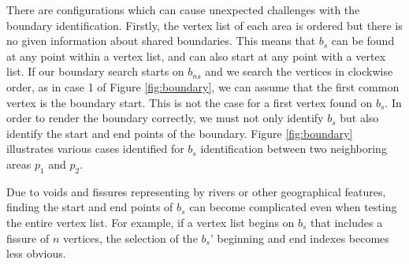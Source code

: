 There are configurations which can cause unexpected challenges with the boundary identification. Firstly, the vertex list of each area is ordered but there is no given information about shared boundaries. This means that $b_{s}$ can be found at any point within a vertex list, and can also start at any point with a vertex list. If our boundary search starts on $b_{ns}$ and we search the vertices in clockwise order, as in case 1 of Figure \ref{fig:boundary}, we can assume that the first common vertex is the boundary start. This is not the case for a first vertex found on $b_{s}$. In order to render the boundary correctly, we must not only identify $b_{s}$ but also identify the start and end points of the boundary. Figure \ref{fig:boundary} illustrates various cases identified for $b_{s}$ identification between two neighboring areas $p_1$ and $p_2$. 

Due to voids and fissures representing by rivers or other geographical features, finding the start and end points of $b_{s}$ can become complicated even when testing the entire vertex list. For example, if a vertex list begins on $b_{s}$ that includes a fissure of $n$ vertices, the selection of the $b_{s}$' beginning and end indexes becomes less obvious.

